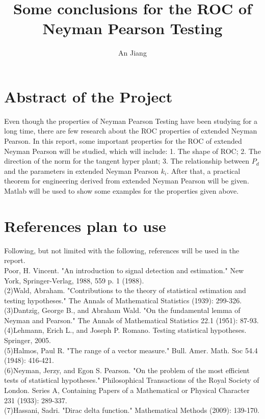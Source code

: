 \documentclass[10pt,a4paper]{report}
\author{An Jiang}
\title{Some conclusions for the ROC of Neyman Pearson Testing}
\begin{document}
\maketitle
\section{Abstract of the Project}
Even though the properties of Neyman Pearson Testing have been studying for a long time, there are few research about the ROC properties of extended Neyman Pearson. In this report, some important properties for the ROC of extended Neyman Pearson will be studied, which will include: 1. The shape of ROC; 2. The direction of the norm for the tangent hyper plant; 3. The relationship between $P_d$ and the parameters in extended Neyman Pearson $k_i$. After that, a practical theorem for engineering derived from extended Neyman Pearson will be given. Matlab will be used to show some examples for the properties given above. 

\section{References plan to use}
Following, but not limited with the following, references will be used in the report.
\\ [1]Poor, H. Vincent. "An introduction to signal detection and estimation." New York, Springer-Verlag, 1988, 559 p. 1 (1988).
\\(2)Wald, Abraham. "Contributions to the theory of statistical estimation and testing hypotheses." The Annals of Mathematical Statistics (1939): 299-326.
\\(3)Dantzig, George B., and Abraham Wald. "On the fundamental lemma of Neyman and Pearson." The Annals of Mathematical Statistics 22.1 (1951): 87-93.
\\(4)Lehmann, Erich L., and Joseph P. Romano. Testing statistical hypotheses. Springer, 2005.
\\(5)Halmos, Paul R. "The range of a vector measure." Bull. Amer. Math. Soc 54.4 (1948): 416-421.
\\(6)Neyman, Jerzy, and Egon S. Pearson. "On the problem of the most efficient tests of statistical hypotheses." Philosophical Transactions of the Royal Society of London. Series A, Containing Papers of a Mathematical or Physical Character 231 (1933): 289-337.
\\(7)Hassani, Sadri. "Dirac delta function." Mathematical Methods (2009): 139-170.
\end{document}

